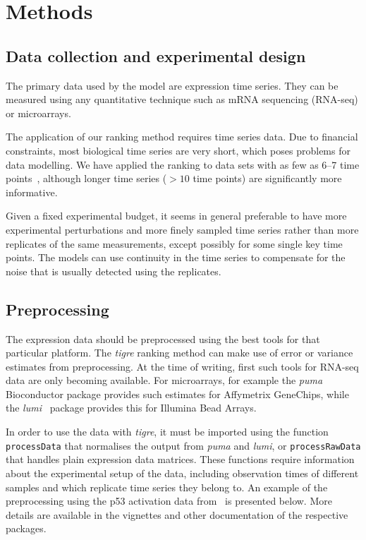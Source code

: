 \documentclass[11pt]{article}
\newcommand{\Rpackage}[1]{\emph{#1}}
\newcommand{\tigre}[0]{\Rpackage{tigre}}
\begin{document}
\section{Methods}

\subsection{Data collection and experimental design}

The primary data used by the model are expression time series.  They
can be measured using any quantitative technique such as mRNA
sequencing (RNA-seq) or microarrays.

The application of our ranking method requires time series data.  Due
to financial constraints, most biological time series are very short,
which poses problems for data modelling.  We have applied the ranking
to data sets with as few as 6--7 time
points~\cite{Honkela2010MLSP,Honkela2010PNAS}, although longer time
series ($> 10$ time points) are significantly more informative.

Given a fixed experimental budget, it seems in general preferable to
have more experimental perturbations and more finely sampled time
series rather than more replicates of the same measurements, except
possibly for some single key time points.  The models can use
continuity in the time series to compensate for the noise that is
usually detected using the replicates.

\subsection{Preprocessing}

The expression data should be preprocessed using the best tools for
that particular platform.  The \tigre{} ranking method can make use of
error or variance estimates from preprocessing.  At the time of
writing, first such tools for RNA-seq data are only becoming
available.  For microarrays, for example the
\Rpackage{puma}~\cite{Pearson2009} Bioconductor package provides such
estimates for Affymetrix GeneChips, while the
\Rpackage{lumi}~\cite{Du2008} package provides this for Illumina Bead
Arrays.

In order to use the data with \tigre{}, it must be imported using the
function \texttt{processData} that normalises the output from
\Rpackage{puma} and \Rpackage{lumi}, or \texttt{processRawData} that
handles plain expression data matrices.  These functions require
information about the experimental setup of the data, including
observation times of different samples and which replicate time series
they belong to.  An example of the preprocessing using the p53
activation data from~\cite{Barenco2006a} is presented below.  More
details are available in the vignettes and other documentation of the
respective packages.
\end{document}
